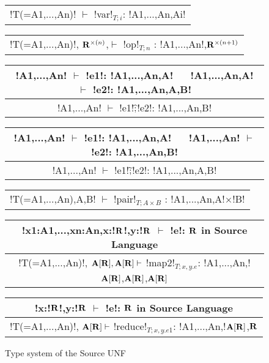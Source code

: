 \begin{figure*}[tb]
    \centering
    \begin{tabular}{c} 
    \\\hline
    !T(=A1,...,An)! $\vdash$ !var!$_{T;i}$: !A1,...,An,Ai!
    \end{tabular}
    \hspace{0.5cm}
    \begin{tabular}{c}
        \\\hline
        !T(=A1,...,An)!, $\mathbf{R}^{\times(n)}$,$\vdash$ !op!$_{T;n}$ : !A1,...,An!,$\mathbf{R}^{\times(n+1)}$
    \end{tabular}

    \begin{tabular}{c}
    !A1,...,An! $\vdash$ !e1!: !A1,...,An,A! $\quad$ !A1,...,An,A! $\vdash$ !e2!: !A1,...,An,A,B! \\\hline
    !A1,...,An! $\vdash$ !e1!$\widehat{;}$!e2!: !A1,...,An,B!
    \end{tabular}
    \hspace{0.5cm}
    \begin{tabular}{c}
        !A1,...,An! $\vdash$ !e1!: !A1,...,An,A! $\quad$ !A1,...,An! $\vdash$ !e2!: !A1,...,An,B! \\\hline
        !A1,...,An! $\vdash$ !e1!$\widetilde{;}$!e2!: !A1,...,An,A,B!
    \end{tabular}

    \begin{tabular}{c}
        \\\hline
        !T(=A1,...,An),A,B! $\vdash$ !pair!$_{T;A\times B}$ : !A1,...,An,A!$\times$!B!
    \end{tabular}

    \begin{tabular}{c}
        !x1:A1,...,xn:An,x:!$\mathbf{R}$!,y:!$\mathbf{R}$ $\vdash$ !e!: $\mathbf{R}$ in Source Language
        \\\hline  
        !T(=A1,...,An)!, $\mathbf{A}[\mathbf{R}],\mathbf{A}[\mathbf{R}] \vdash$ !map2!$_{T; x,y.e}$: !A1,...,An,!$\mathbf{A}[\mathbf{R}]$,$\mathbf{A}[\mathbf{R}]$,$\mathbf{A}[\mathbf{R}]$
    \end{tabular}

    \begin{tabular}{c}
        !x:!$\mathbf{R}$!,y:!$\mathbf{R}$ $\vdash$ !e!: $\mathbf{R}$ in Source Language
        \\\hline  
        !T(=A1,...,An)!, $\mathbf{A}[\mathbf{R}] \vdash$ !reduce!$_{T; x,y.e1}$: !A1,...,An,!$\mathbf{A}[\mathbf{R}]$,$\mathbf{R}$
    \end{tabular}
    \vspace{-0.2cm}
    \caption{Type system of the Source UNF}
    \vspace{-0.4cm}
    \label{fig:source_unf_typesystem}
\end{figure*}